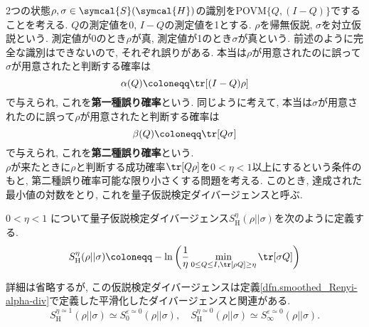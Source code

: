 

2つの状態$\rho, \sigma\in\symcal{S}(\symcal{H})$の識別をPOVM$\{Q, (I-Q)\}$ですることを考える. 
$Q$の測定値を0, $I-Q$の測定値を1とする. 
$\rho$を帰無仮説, $\sigma$を対立仮説という. 
測定値が0のとき$\rho$が真, 測定値が1のとき$\sigma$が真という. 
前述のように完全な識別はできないので, それぞれ誤りがある. 
本当は$\rho$が用意されたのに誤って$\sigma$が用意されたと判断する確率は
\begin{equation}
  \alpha(Q)\coloneqq\tr[(I-Q)\rho]
\end{equation}
で与えられ, これを\textbf{第一種誤り確率}という. 
同じように考えて, 本当は$\sigma$が用意されたのに誤って$\rho$が用意されたと判断する確率は
\begin{equation}
  \beta(Q)\coloneqq \tr[Q\sigma]
\end{equation}
で与えられ, これを\textbf{第二種誤り確率}という. \\

$\rho$が来たときに$\rho$と判断する成功確率$\tr[Q\rho]$を$0<\eta<1$以上にするという条件のもと, 第二種誤り確率可能な限り小さくする問題を考える. 
このとき, 達成された最小値の対数をとり, これを量子仮説検定ダイバージェンスと呼ぶ. 
\begin{mydfn}[量子仮説検定ダイバージェンス]
  $0<\eta<1$ について量子仮説検定ダイバージェンス$S_{\text{H}}^\eta(\rho||\sigma)$を次のように定義する. 
  \begin{equation}
    S_{\text{H}}^\eta(\rho||\sigma)\coloneqq -\ln\left( \frac{1}{\eta}\min_{0\leq Q\leq I, \tr[\rho Q]\geq \eta} \tr[\sigma Q]\right)
  \end{equation}
\end{mydfn}

詳細は省略するが, この仮説検定ダイバージェンスは定義\ref{dfn.smoothed_Renyi-alpha-div}で定義した平滑化したダイバージェンスと関連がある. 
\begin{equation}
  S_{\text{{H}}}^{\eta\simeq 1}(\rho||\sigma)\simeq S_0^{\varepsilon\simeq 0}(\rho||\sigma),\quad S_{\text{{H}}}^{\eta\simeq 0}(\rho||\sigma)\simeq S_\infty^{\varepsilon\simeq 0}(\rho||\sigma). \label{eq.hypothesis-div_Renyi-alpha-div}
\end{equation}

